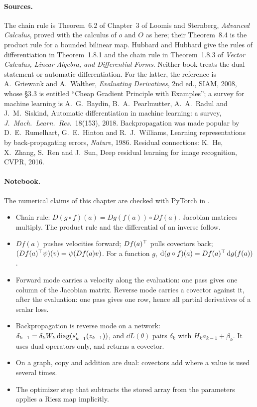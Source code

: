 \begin{notechapter}
\paragraph{Sources.} The chain rule is Theorem~6.2 of Chapter~3 of
Loomis and Sternberg, \emph{Advanced Calculus}, proved with the calculus
of $o$ and $O$ as here; their Theorem~8.4 is the product rule for a
bounded bilinear map. Hubbard and Hubbard give the rules of
differentiation in Theorem~1.8.1 and the chain rule in Theorem~1.8.3 of
\emph{Vector Calculus, Linear Algebra, and Differential Forms}. Neither
book treats the dual statement or automatic differentiation. For the
latter, the reference is A.~Griewank and A.~Walther, \emph{Evaluating
Derivatives}, 2nd ed., SIAM, 2008, whose \S3.3 is entitled ``Cheap
Gradient Principle with Examples''; a survey for machine learning is
A.~G.~Baydin, B.~A.~Pearlmutter, A.~A.~Radul and J.~M.~Siskind, Automatic
differentiation in machine learning: a survey, \emph{J.\ Mach.\ Learn.\
Res.}\ 18(153), 2018. Backpropagation was made popular by
D.~E.~Rumelhart, G.~E.~Hinton and R.~J.~Williams, Learning
representations by back-propagating errors, \emph{Nature}, 1986. Residual
connections: K.~He, X.~Zhang, S.~Ren and J.~Sun, Deep residual learning
for image recognition, CVPR, 2016.

\paragraph{Notebook.} The numerical claims of this chapter are checked
with PyTorch in \notebook{07-chain-rule-autodiff.ipynb}.

\begin{chaptersummary}
\begin{itemize}[nosep]
  \item Chain rule: $D(g\circ f)(a) = Dg(f(a))\circ Df(a)$. Jacobian
        matrices multiply. The product rule and the differential of an
        inverse follow.
  \item $Df(a)$ pushes velocities forward; $Df(a)^{\top}$ pulls covectors
        back; $(Df(a)^{\top}\psi)(v) = \psi(Df(a)v)$. For a function $g$,
        $\mathrm{d}(g\circ f)(a) = Df(a)^{\top}\,\mathrm{d} g(f(a))$.
  \item Forward mode carries a velocity along the evaluation: one pass
        gives one column of the Jacobian matrix. Reverse mode carries a
        covector against it, after the evaluation: one pass gives one
        row, hence all partial derivatives of a scalar loss.
  \item Backpropagation is reverse mode on a network:
        $\delta_{k-1} = \delta_kW_k\operatorname{diag}(s_{k-1}'(z_{k-1}))$, and
        $\dd L(\theta)$ pairs $\delta_k$ with $H_ka_{k-1} + \beta_k$. It
        uses dual operators only, and returns a covector.
  \item On a graph, copy and addition are dual: covectors add where a
        value is used several times.
  \item The optimizer step that subtracts the stored array from the
        parameters applies a Riesz map implicitly.
\end{itemize}
\end{chaptersummary}


\end{notechapter}
